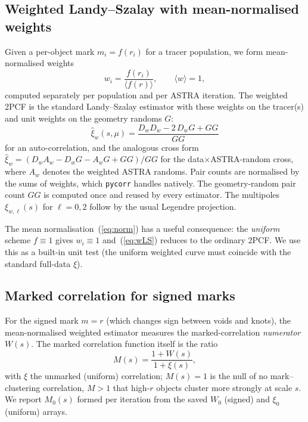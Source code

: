 \documentclass[11pt]{article}
\newcommand{\code}[1]{\texttt{#1}}
\newcommand{\rpar}{r}
\newcommand{\xifull}{\xi}
\begin{document}
\subsection{Weighted Landy--Szalay with mean-normalised weights}
Given a per-object mark $m_i=f(\rpar_i)$ for a tracer population, we form
mean-normalised weights
\begin{equation}
  w_i=\frac{f(\rpar_i)}{\langle f(\rpar)\rangle},
  \qquad \langle w\rangle = 1,
  \label{eq:norm}
\end{equation}
computed separately per population and per ASTRA iteration.  The weighted 2PCF is
the standard Landy--Szalay estimator with these weights on the tracer(s) and unit
weights on the geometry randoms $G$:
\begin{equation}
  \hat\xi_w(s,\mu)=\frac{D_wD_w-2\,D_wG+GG}{GG}
  \label{eq:wLS}
\end{equation}
for an auto-correlation, and the analogous cross form
$\hat\xi_w=(D_wA_w-D_wG-A_wG+GG)/GG$ for the data$\times$ASTRA-random cross, where
$A_w$ denotes the weighted ASTRA randoms.  Pair counts are normalised by the sums
of weights, which \code{pycorr} handles natively.  The geometry-random pair count
$GG$ is computed once and reused by every estimator.  The multipoles
$\xi_{w,\ell}(s)$ for $\ell=0,2$ follow by the usual Legendre projection.

The mean normalisation~(\ref{eq:norm}) has a useful consequence: the
\emph{uniform} scheme $f\equiv1$ gives $w_i\equiv1$ and~(\ref{eq:wLS}) reduces to
the ordinary 2PCF.  We use this as a built-in unit test (the uniform weighted
curve must coincide with the standard full-data $\xifull$).

\subsection{Marked correlation for signed marks}
For the signed mark $m=\rpar$ (which changes sign between voids and knots), the
mean-normalised weighted estimator measures the marked-correlation
\emph{numerator} $W(s)$.  The marked correlation function itself is the ratio
\begin{equation}
  M(s)=\frac{1+W(s)}{1+\xifull(s)},
  \label{eq:MCF}
\end{equation}
with $\xifull$ the unmarked (uniform) correlation; $M(s)=1$ is the null of no
mark--clustering correlation, $M>1$ that high-$\rpar$ objects cluster more
strongly at scale $s$.  We report $M_0(s)$ formed per iteration from the saved
$W_0$ (signed) and $\xi_0$ (uniform) arrays.
\end{document}
